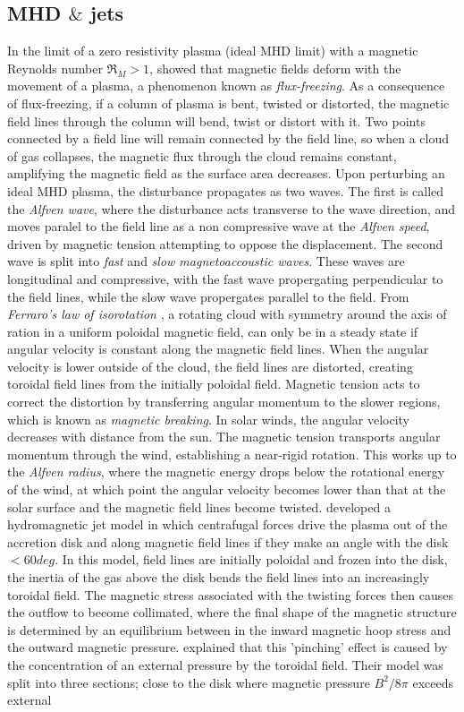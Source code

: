 \documentclass[11pt]{article}
\begin{document}
\subsection{MHD $\&$ jets}
\label{sub:MHD}
In the limit of a zero resistivity plasma (ideal MHD limit) with a magnetic Reynolds number $\Re_{M}>1$, \cite{Alfven1942} showed that magnetic fields deform with the movement of a plasma, a phenomenon known as \emph{flux-freezing}. As a consequence of flux-freezing, if a column of plasma is bent, twisted or distorted, the magnetic field lines through the column will bend, twist or distort with it. Two points connected by a field line will remain connected by the field line, so when a cloud of gas collapses, the magnetic flux through the cloud remains constant, amplifying the magnetic field as the surface area decreases. Upon perturbing an ideal MHD plasma, the disturbance propagates as two waves. The first is called the \emph{Alfven wave}, where the disturbance acts transverse to the wave direction, and moves paralel to the field line as a non compressive wave at the \emph{Alfven speed}, driven by magnetic tension attempting to oppose the displacement. The second wave is split into \emph{fast} and \emph{slow magnetoaccoustic waves}. These waves are longitudinal and compressive, with the fast wave propergating perpendicular to the field lines, while the slow wave propergates parallel to the field. From \emph{Ferraro's law of isorotation} \citep{Ferraro1937}, a rotating cloud with symmetry around the axis of ration in a uniform poloidal magnetic field, can only be in a steady state if angular velocity is constant along the magnetic field lines. When the angular velocity is lower outside of the cloud, the field lines are distorted, creating toroidal field lines from the initially poloidal field. Magnetic tension acts to correct the distortion by transferring angular momentum to the slower regions, which is known as \emph{magnetic breaking}. In solar winds, the angular velocity decreases with distance from the sun. The magnetic tension transports angular momentum through the wind, establishing a near-rigid rotation. This works up to the \emph{Alfven radius}, where the magnetic energy drops below the rotational energy of the wind, at which point the angular velocity becomes lower than that at the solar surface and the magnetic field lines become twisted. \cite{Blandford1982} developed a hydromagnetic jet model in which centrafugal forces drive the plasma out of the accretion disk and along magnetic field lines if they make an angle with the disk $<60deg$. In this model, field lines are initially poloidal and frozen into the disk, the inertia of the gas above the disk bends the field lines into an increasingly toroidal field. The magnetic stress associated with the twisting forces then causes the outflow to become collimated, where the final shape of the magnetic structure is determined by an equilibrium between in the inward magnetic hoop stress and the outward magnetic pressure. \cite{Lynden-Bell1996} explained that this 'pinching' effect is caused by the concentration of an external pressure by the toroidal field. Their model was split into three sections; close to the disk where magnetic pressure $B^{2}/8\pi$ exceeds external 
\end{document}
